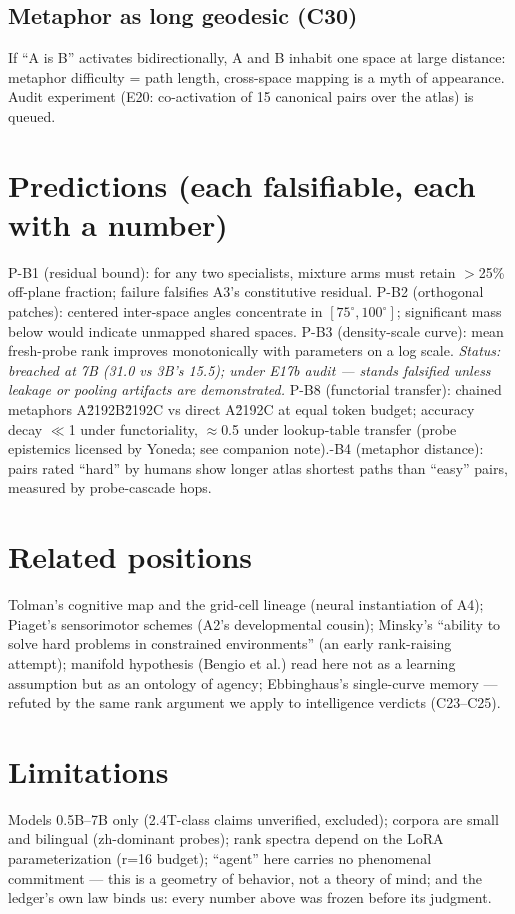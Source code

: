\documentclass[11pt]{article}
\begin{document}
\subsection{Metaphor as long geodesic (C30)}
If ``A is B'' activates bidirectionally, A and B inhabit one space at large distance:
metaphor difficulty = path length, cross-space mapping is a myth of appearance.
Audit experiment (E20: co-activation of 15 canonical pairs over the atlas) is queued.

\section{Predictions (each falsifiable, each with a number)}
P-B1 (residual bound): for any two specialists, mixture arms must retain
$>$25\% off-plane fraction; failure falsifies A3's constitutive residual.
P-B2 (orthogonal patches): centered inter-space angles concentrate in
$[75^\circ,100^\circ]$; significant mass below would indicate unmapped shared spaces.
P-B3 (density-scale curve): mean fresh-probe rank improves monotonically with parameters on a log scale. \emph{Status: breached at 7B (31.0 vs 3B's 15.5); under E17b audit --- stands falsified unless leakage or pooling artifacts are demonstrated.}
P-B8 (functorial transfer): chained metaphors A\u2192B\u2192C vs direct A\u2192C at equal token budget; accuracy decay $\ll$1 under functoriality, $\approx$0.5 under lookup-table transfer (probe epistemics licensed by Yoneda; see companion note).\n\nP-B4 (metaphor distance): pairs rated ``hard'' by humans show longer atlas shortest
paths than ``easy'' pairs, measured by probe-cascade hops.

\section{Related positions}
Tolman's cognitive map and the grid-cell lineage (neural instantiation of A4);
Piaget's sensorimotor schemes (A2's developmental cousin); Minsky's
``ability to solve hard problems in constrained environments'' (an early
rank-raising attempt); manifold hypothesis (Bengio et al.) read here not as a
learning assumption but as an ontology of agency; Ebbinghaus's single-curve memory
--- refuted by the same rank argument we apply to intelligence verdicts (C23--C25).

\section{Limitations}
Models 0.5B--7B only (2.4T-class claims unverified, excluded); corpora are small and
bilingual (zh-dominant probes); rank spectra depend on the LoRA parameterization
(r=16 budget); ``agent'' here carries no phenomenal commitment --- this is a geometry
of behavior, not a theory of mind; and the ledger's own law binds us: every number
above was frozen before its judgment.
\end{document}
